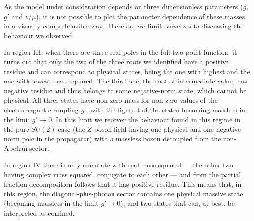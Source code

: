 As the model under consideration depends on three dimensionless parameters ($g$, $g'$ and $\nu/\bar\mu$), it is not possible to plot the parameter dependence of these masses in a visually comprehensible way. Therefore we limit ourselves to discussing the behaviour we observed.

In region III, when there are three real poles in the full two-point function, it turns out that only the two of the three roots we identified have a positive residue and can correspond to physical states, being the one with highest and the one with lowest mass squared. The third one, the root of intermediate value, has negative residue and thus belongs to some negative-norm state, which cannot be physical. All three states have non-zero mass for non-zero values of the electromagnetic coupling $g'$, with the lightest of the states becoming massless in the limit $g'\to0$. In this limit we recover the behaviour found in this regime in the pure $SU(2)$ case \cite{Capri:2012ah} (the $Z$-boson field having one physical and one negative-norm pole in the propagator) with a massless boson decoupled from the non-Abelian sector.

In region IV there is only one state with real mass squared --- the other two having complex mass squared, conjugate to each other --- and from the partial fraction decomposition follows that it has positive residue. This means that, in this region, the diagonal-plus-photon sector contains one physical massive state (becoming massless in the limit $g'\to0$), and two states that can, at best, be interpreted as confined.


































